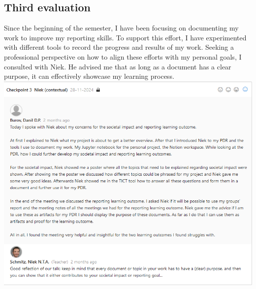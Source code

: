 \documentclass{article}
\begin{document}
\subsection{Third evaluation}
Since the beginning of the semester, I have been focusing on documenting my work to improve my reporting skills. To support this effort, I have experimented with different tools to record the progress and results of my work. Seeking a professional perspective on how to align these efforts with my personal goals, I consulted with Niek. He advised me that as long as a document has a clear purpose, it can effectively showcase my learning process.\\
\includegraphics[width=\textwidth,keepaspectratio]{images/Feedback_Niek_1.png}\\
\end{document}
